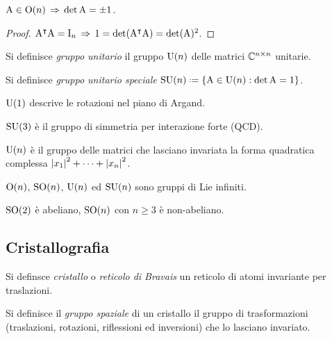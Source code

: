 \begin{proposition}
	$ \mathrm{A} \in \mathrm{O}(n) \,\Rightarrow\, \det \mathrm{A} = \pm 1 $.
\end{proposition}
\begin{proof}
	$ \mathrm{A}^{\intercal} \mathrm{A} = \mathrm{I}_n \,\Rightarrow\, 1 = \det(\mathrm{A}^{\intercal}\mathrm{A}) = \det(\mathrm{A})^2 $.
\end{proof}

\begin{definition}
	Si definisce \textit{gruppo unitario} il gruppo $ \mathrm{U}(n) $ delle matrici $ \mathbb{C}^{n \times n} $ unitarie.
\end{definition}

\begin{definition}
	Si definisce \textit{gruppo unitario speciale} $ \SUn{n} \defeq \{ \tens{A} \in \Un{n} : \det \tens{A} = 1\} $.
\end{definition}

\begin{example}
	$ \mathrm{U}(1) $ descrive le rotazioni nel piano di Argand.
\end{example}
\begin{example}
	$ \mathrm{SU}(3) $ è il gruppo di simmetria per interazione forte (QCD).
\end{example}

$ \mathrm{U}(n) $ è il gruppo delle matrici che lasciano invariata la forma quadratica complessa $ \left\lvert x_1\right\rvert^2 + \dots + \left\lvert x_n\right\rvert^2 $.

\begin{proposition}
	$ \mathrm{O}(n) $, $ \mathrm{SO}(n) $, $ \mathrm{U}(n) $ ed $ \mathrm{SU}(n) $ sono gruppi di Lie infiniti.
\end{proposition}

\begin{proposition}
	$ \mathrm{SO}(2) $ è abeliano, $ \mathrm{SO}(n) $ con $ n \ge 3 $ è non-abeliano.
\end{proposition}

\subsection{Cristallografia}

\begin{definition}
	Si definsce \textit{cristallo} o \textit{reticolo di Bravais} un reticolo di atomi invariante per traslazioni.
\end{definition}

\begin{definition}
	Si definisce il \textit{gruppo spaziale} di un cristallo il gruppo di trasformazioni (traslazioni, rotazioni, riflessioni ed inversioni) che lo lasciano invariato.
\end{definition}

